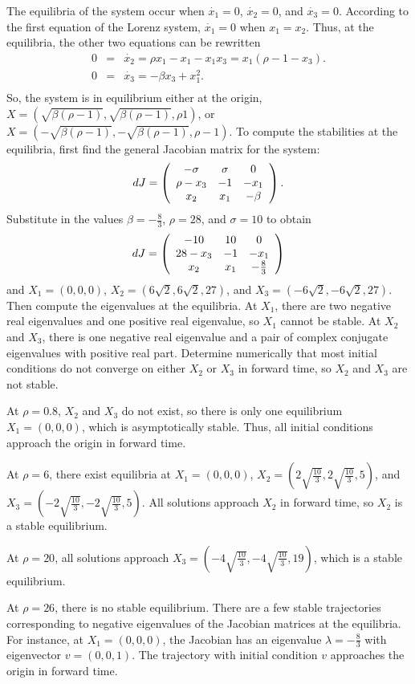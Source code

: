 \documentclass{ximera}
\begin{document}
\soln The equilibria of the system occur when $\dot{x_1} = 0$, $\dot{x_2}
= 0$, and $\dot{x_3} = 0$.  According to the first equation of the Lorenz
system, $\dot{x_1} = 0$ when $x_1 = x_2$.  Thus, at the equilibria, the
other two equations can be rewritten
\[
\begin{array}{rcl}
0 & = & \dot{x_2} = \rho x_1 - x_1 - x_1x_3 = x_1(\rho - 1 - x_3). \\
0 & = & \dot{x_3} = -\beta x_3 + x_1^2. \\
\end{array}
\]
So, the system is in equilibrium either at the origin, $X =
(\sqrt{\beta (\rho - 1)}, \sqrt{\beta (\rho - 1)}, \rho 1)$, or
$X = (-\sqrt{\beta (\rho - 1)}, -\sqrt{\beta (\rho - 1)}, \rho - 1)$.
To compute the stabilities at the equilibria, first find the general
Jacobian matrix for the system:
\[
dJ = \left(\begin{array}{ccc} -\sigma & \sigma & 0 \\ \rho - x_3 & -1 & -x_1 \\ x_2 & x_1 & -\beta\end{array}\right).
\]
Substitute in the values $\beta = -\frac{8}{3}$, $\rho = 28$, and $\sigma
= 10$ to obtain
\[
dJ = \left(\begin{array}{ccc} -10 & 10 & 0 \\ 28 - x_3 & -1 & -x_1 \\ x_2 & x_1 & -\frac{8}{3}\end{array}\right)
\]
and $X_1 = (0,0,0)$, $X_2 = (6\sqrt{2},6\sqrt{2},27)$, and
$X_3 = (-6\sqrt{2},-6\sqrt{2},27)$.  Then compute the eigenvalues at the
equilibria.  At $X_1$, there are two negative real eigenvalues and one 
positive real eigenvalue, so $X_1$ cannot be stable.  At $X_2$ and $X_3$,
there is one negative real eigenvalue and a pair of complex conjugate
eigenvalues with positive real part.  Determine numerically that most
initial conditions do not converge on either $X_2$ or $X_3$ in forward time,
so $X_2$ and $X_3$ are not stable.


At $\rho = 0.8$, $X_2$ and $X_3$ do not exist, so there is only one
equilibrium $X_1 = (0,0,0)$, which is asymptotically stable.  Thus, all
initial conditions approach the origin in forward time.

\para At $\rho = 6$, there exist equilibria at $X_1 = (0,0,0)$, $X_2 =
(2\sqrt{\frac{10}{3}}, 2\sqrt{\frac{10}{3}}, 5)$, and
$X_3 = (-2\sqrt{\frac{10}{3}}, -2\sqrt{\frac{10}{3}}, 5)$.  All solutions
approach $X_2$ in forward time, so $X_2$ is a stable equilibrium.

\para At $\rho = 20$, all solutions approach $X_3 = (-4\sqrt{\frac{10}{3}},
-4\sqrt{\frac{10}{3}}, 19)$, which is a stable equilibrium.

\para At $\rho = 26$, there is no stable equilibrium.  There are a few
stable trajectories corresponding to negative eigenvalues of the Jacobian
matrices at the equilibria.  For instance, at $X_1 = (0,0,0)$, the Jacobian
has an eigenvalue $\lambda = -\frac{8}{3}$ with eigenvector $v = (0,0,1)$.
The trajectory with initial condition $v$ approaches the origin in forward
time.
\end{document}
